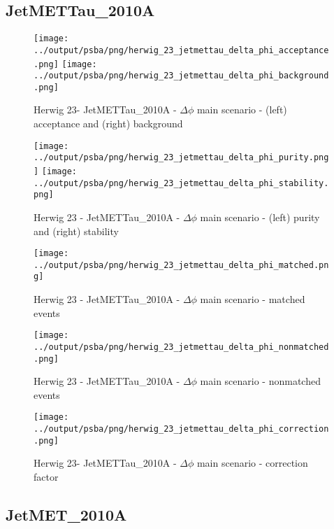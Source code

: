 \documentclass[11pt]{book}
\begin{document}
\subsection{JetMETTau\_2010A}

\begin{figure}[ht]
\centering
\texttt{[image: ../output/psba/png/herwig\_23\_jetmettau\_delta\_phi\_acceptance.png]}
\texttt{[image: ../output/psba/png/herwig\_23\_jetmettau\_delta\_phi\_background.png]}
\caption{Herwig 23- JetMETTau\_2010A - $\Delta\phi$ main scenario - (left) acceptance and (right) background}
\label{fig:hw_23_jetmettau_delta_phi_ab}
\end{figure}

\begin{figure}[ht]
\centering
\texttt{[image: ../output/psba/png/herwig\_23\_jetmettau\_delta\_phi\_purity.png]}
\texttt{[image: ../output/psba/png/herwig\_23\_jetmettau\_delta\_phi\_stability.png]}
\caption{Herwig 23 - JetMETTau\_2010A - $\Delta\phi$ main scenario - (left) purity and (right) stability}
\label{fig:hw_23_jetmettau_delta_phi_ps}
\end{figure}

\begin{figure}[ht]
\centering
\texttt{[image: ../output/psba/png/herwig\_23\_jetmettau\_delta\_phi\_matched.png]}
\caption{Herwig 23 - JetMETTau\_2010A - $\Delta\phi$ main scenario - matched events}
\label{fig:hw_23_jetmettau_delta_phi_matched}
\end{figure}

\begin{figure}[ht]
\centering
\texttt{[image: ../output/psba/png/herwig\_23\_jetmettau\_delta\_phi\_nonmatched.png]}
\caption{Herwig 23 - JetMETTau\_2010A - $\Delta\phi$ main scenario - nonmatched events}
\label{fig:hw_23_jetmettau_delta_phi_nonmatched}
\end{figure}

\begin{figure}[ht]
\centering
\texttt{[image: ../output/psba/png/herwig\_23\_jetmettau\_delta\_phi\_correction.png]}
\caption{Herwig 23- JetMETTau\_2010A - $\Delta\phi$ main scenario - correction factor}
\label{fig:hw_23_jetmettau_delta_phi_correction}
\end{figure}

\clearpage
\subsection{JetMET\_2010A}
\end{document}
